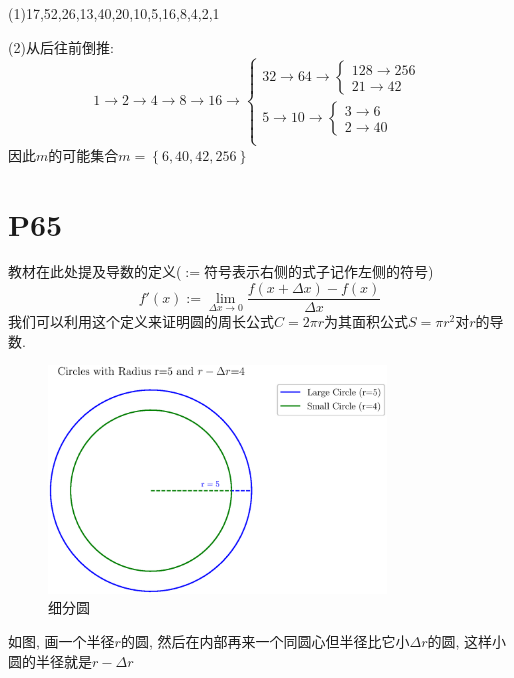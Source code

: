\documentclass{book}
\begin{document}
    \vspace{2em}

    (1)17,52,26,13,40,20,10,5,16,8,4,2,1

    (2)从后往前倒推:$$1\rightarrow 2\rightarrow 4\rightarrow 8\rightarrow 16\rightarrow \left\{\begin{matrix} 
        32\rightarrow 64\rightarrow  \left\{\begin{matrix} 
        128\rightarrow 256\\  
        21\rightarrow 42
      \end{matrix}\right. \\  
        5\rightarrow 10\rightarrow \left\{\begin{matrix} 
        3\rightarrow 6\\  
        2\rightarrow 40
      \end{matrix}\right. \\  
      \end{matrix}\right. $$
    因此$m$的可能集合$m=\left\{ 6,40,42,256 \right\}$

    \section{\textcolor[rgb]{0.11,0.65,0.52}{P65}}
    教材在此处提及导数的定义($:=$符号表示右侧的式子记作左侧的符号)$$f'(x):=\lim_{\Delta x \to 0} \frac{f(x+\Delta x)-f(x)}{\Delta x} $$
    我们可以利用这个定义来证明圆的周长公式$C=2\pi r$为其面积公式$S=\pi r^2$对$r$的导数.

    \begin{figure}[htbp]
        \centering
        \includegraphics[width=0.8\textwidth]{img/CircleAreaDiverse.eps}
        \caption{细分圆}
    \end{figure}

    如图, 画一个半径$r$的圆, 然后在内部再来一个同圆心但半径比它小$\Delta r$的圆, 这样小圆的半径就是$r-\Delta r$
\end{document}

